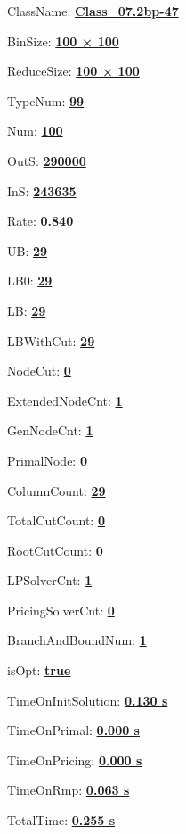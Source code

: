 \documentclass[11pt]{article}
\begin{document}
\pagestyle{empty}


ClassName: \underline{\textbf{Class_07.2bp-47}}
\par
BinSize: \underline{\textbf{100 × 100}}
\par
ReduceSize: \underline{\textbf{100 × 100}}
\par
TypeNum: \underline{\textbf{99}}
\par
Num: \underline{\textbf{100}}
\par
OutS: \underline{\textbf{290000}}
\par
InS: \underline{\textbf{243635}}
\par
Rate: \underline{\textbf{0.840}}
\par
UB: \underline{\textbf{29}}
\par
LB0: \underline{\textbf{29}}
\par
LB: \underline{\textbf{29}}
\par
LBWithCut: \underline{\textbf{29}}
\par
NodeCut: \underline{\textbf{0}}
\par
ExtendedNodeCnt: \underline{\textbf{1}}
\par
GenNodeCnt: \underline{\textbf{1}}
\par
PrimalNode: \underline{\textbf{0}}
\par
ColumnCount: \underline{\textbf{29}}
\par
TotalCutCount: \underline{\textbf{0}}
\par
RootCutCount: \underline{\textbf{0}}
\par
LPSolverCnt: \underline{\textbf{1}}
\par
PricingSolverCnt: \underline{\textbf{0}}
\par
BranchAndBoundNum: \underline{\textbf{1}}
\par
isOpt: \underline{\textbf{true}}
\par
TimeOnInitSolution: \underline{\textbf{0.130 s}}
\par
TimeOnPrimal: \underline{\textbf{0.000 s}}
\par
TimeOnPricing: \underline{\textbf{0.000 s}}
\par
TimeOnRmp: \underline{\textbf{0.063 s}}
\par
TotalTime: \underline{\textbf{0.255 s}}
\par
\newpage


\end{document}
